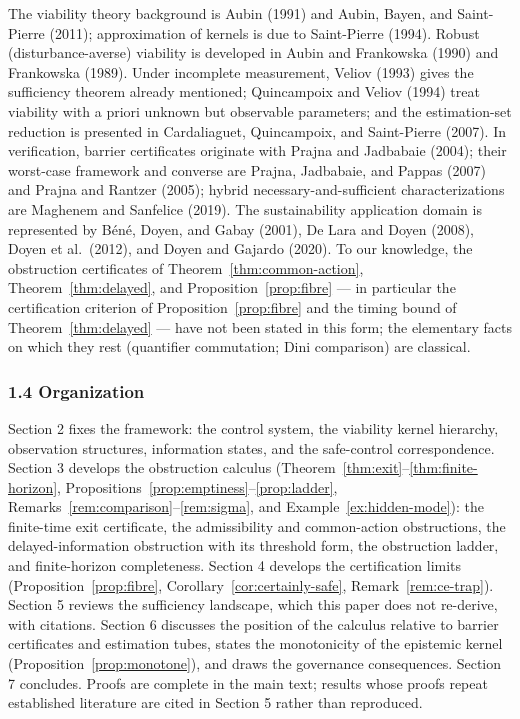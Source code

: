 \documentclass[11pt]{article}
\theoremstyle{definition}
\begin{document}
The viability theory background is Aubin (1991) and Aubin, Bayen, and
Saint-Pierre (2011); approximation of kernels is due to Saint-Pierre
(1994). Robust (disturbance-averse) viability is developed in Aubin and
Frankowska (1990) and Frankowska (1989). Under incomplete measurement,
Veliov (1993) gives the sufficiency theorem already mentioned;
Quincampoix and Veliov (1994) treat viability with a priori unknown but
observable parameters; and the estimation-set reduction is presented in
Cardaliaguet, Quincampoix, and Saint-Pierre (2007). In verification,
barrier certificates originate with Prajna and Jadbabaie (2004); their
worst-case framework and converse are Prajna, Jadbabaie, and Pappas
(2007) and Prajna and Rantzer (2005); hybrid necessary-and-sufficient
characterizations are Maghenem and Sanfelice (2019). The sustainability
application domain is represented by B\'en\'e, Doyen, and Gabay (2001), De
Lara and Doyen (2008), Doyen et al.~(2012), and Doyen and Gajardo
(2020). To our knowledge, the obstruction certificates of Theorem~\ref{thm:common-action}, Theorem~\ref{thm:delayed}, and Proposition~\ref{prop:fibre}
--- in particular the certification criterion of Proposition~\ref{prop:fibre} and the
timing bound of Theorem~\ref{thm:delayed} --- have not been stated in this form; the elementary facts on which they rest (quantifier commutation; Dini comparison) are classical.

\subsubsection{1.4 Organization}\label{organization}

Section 2 fixes the framework: the control system, the viability kernel
hierarchy, observation structures, information states, and the
safe-control correspondence. Section 3 develops the obstruction calculus (Theorem~\ref{thm:exit}--\ref{thm:finite-horizon}, Propositions~\ref{prop:emptiness}--\ref{prop:ladder}, Remarks~\ref{rem:comparison}--\ref{rem:sigma}, and Example~\ref{ex:hidden-mode}): the finite-time exit certificate, the admissibility and common-action obstructions, the delayed-information obstruction with its threshold form, the obstruction ladder, and finite-horizon completeness. Section 4 develops the certification limits
(Proposition~\ref{prop:fibre}, Corollary~\ref{cor:certainly-safe}, Remark~\ref{rem:ce-trap}). Section 5 reviews the sufficiency
landscape, which this paper does not re-derive, with citations. Section
6 discusses the position of the calculus relative to barrier
certificates and estimation tubes, states the monotonicity of the
epistemic kernel (Proposition~\ref{prop:monotone}), and draws the governance
consequences. Section 7 concludes. Proofs are complete in the main text;
results whose proofs repeat established literature are cited in Section 5 rather than reproduced.
\end{document}
